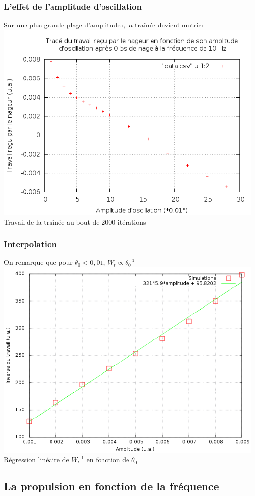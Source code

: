 \documentclass{beamer}
\begin{document}
 \begin{frame}
   \frametitle{L'effet de l'amplitude d'oscillation}
   Sur une plus grande plage d'amplitudes, la traînée devient motrice
   \centering \includegraphics[width= 0.8 \linewidth]{bcp_points.png}\\
   Travail de la traînée au bout de 2000 itérations
 \end{frame}
  
 \begin{frame}
   \frametitle{Interpolation}
   On remarque que pour $ \theta_0 < 0,01$, $W_t \propto \theta_0^{-1}$
   \centering \includegraphics[width= 0.8 \linewidth]{9_courbes_extraites.png}\\
   Régression linéaire de $W_t^{-1}$ en fonction de $\theta_0$
 \end{frame}

 \subsection{La propulsion en fonction de la fréquence}
 	
\end{document}
